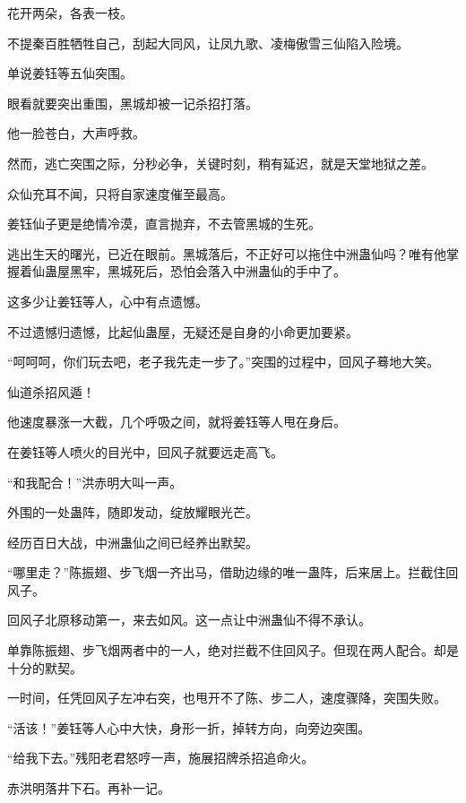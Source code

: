 
\begin{this_body}



花开两朵，各表一枝。

不提秦百胜牺牲自己，刮起大同风，让凤九歌、凌梅傲雪三仙陷入险境。

单说姜钰等五仙突围。

眼看就要突出重围，黑城却被一记杀招打落。

他一脸苍白，大声呼救。

然而，逃亡突围之际，分秒必争，关键时刻，稍有延迟，就是天堂地狱之差。

众仙充耳不闻，只将自家速度催至最高。

姜钰仙子更是绝情冷漠，直言抛弃，不去管黑城的生死。

逃出生天的曙光，已近在眼前。黑城落后，不正好可以拖住中洲蛊仙吗？唯有他掌握着仙蛊屋黑牢，黑城死后，恐怕会落入中洲蛊仙的手中了。

这多少让姜钰等人，心中有点遗憾。

不过遗憾归遗憾，比起仙蛊屋，无疑还是自身的小命更加要紧。

“呵呵呵，你们玩去吧，老子我先走一步了。”突围的过程中，回风子蓦地大笑。

仙道杀招风遁！

他速度暴涨一大截，几个呼吸之间，就将姜钰等人甩在身后。

在姜钰等人喷火的目光中，回风子就要远走高飞。

“和我配合！”洪赤明大叫一声。

外围的一处蛊阵，随即发动，绽放耀眼光芒。

经历百日大战，中洲蛊仙之间已经养出默契。

“哪里走？”陈振翅、步飞烟一齐出马，借助边缘的唯一蛊阵，后来居上。拦截住回风子。

回风子北原移动第一，来去如风。这一点让中洲蛊仙不得不承认。

单靠陈振翅、步飞烟两者中的一人，绝对拦截不住回风子。但现在两人配合。却是十分的默契。

一时间，任凭回风子左冲右突，也甩开不了陈、步二人，速度骤降，突围失败。

“活该！”姜钰等人心中大快，身形一折，掉转方向，向旁边突围。

“给我下去。”残阳老君怒哼一声，施展招牌杀招追命火。

赤洪明落井下石。再补一记。


\end{this_body}
